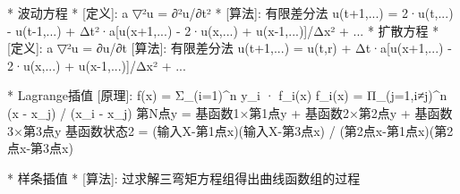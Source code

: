 \documentclass{article}
\begin{document}
*                    波动方程
*	[定义]: a ▽²u = ∂²u/∂t²
*	[算法]: 有限差分法
		u(t+1,...) = 2·u(t,...) - u(t-1,...)
				+ Δt²·a{[u(x+1,...) - 2·u(x,...) + u(x-1,...)]/Δx² + ...}
*                    扩散方程
*	[定义]: a ▽²u = ∂u/∂t
	[算法]: 有限差分法
		u(t+1,...) = u(t,r)
				+ Δt·a{[u(x+1,...) - 2·u(x,...) + u(x-1,...)]/Δx² + ...}



*					Lagrange插值
	[原理]:
		f(x) = Σ_(i=1)^n  y_i · f_i(x)
		f_i(x) = Π_(j=1,i≠j)^n  (x - x_j) / (x_i - x_j)
		第N点y = 基函数1×第1点y + 基函数2×第2点y + 基函数3×第3点y
		基函数状态2 = (输入X-第1点x)(输入X-第3点x) / (第2点x-第1点x)(第2点x-第3点x)


*					样条插值
*	[算法]: 过求解三弯矩方程组得出曲线函数组的过程
\end{document}
